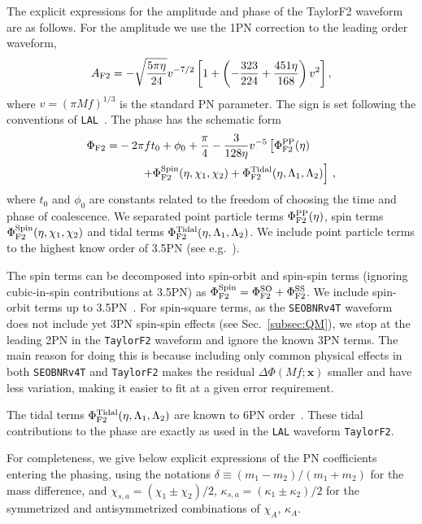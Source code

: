 \documentclass[prd,aps,letter,twocolumn,floatfix,notitlepage,nofootinbib]{revtex4-1}
\def\bx{\mathbf{x}}
\begin{document}
The explicit expressions for the amplitude and phase of the TaylorF2 waveform are as follows. For the amplitude we use the 1PN correction to the leading order waveform,
\begin{equation}
A_{\rm F2} = -\sqrt{\frac{5\pi\eta}{24}} v^{-7/2} \left[ 1 + \left(-\frac{323}{224} + \frac{451\eta}{168} \right)v^{2} \right],
\end{equation}
where $v=(\pi M f)^{1/3}$ is the standard PN parameter. The sign is set following the conventions of \texttt{LAL}~\cite{lal}. The phase has the schematic form
\begin{align}
\Phi_{\rm F2} =& -2\pi f t_{0} + \phi_{0} + \frac{\pi}{4} - \frac{3}{128\eta}v^{-5} \left[\Phi_{\rm F2}^{\rm PP}(\eta) \right. \nonumber\\
	& \left. \qquad + \Phi_{\rm F2}^{\rm Spin} (\eta, \chi_1, \chi_2) + \Phi_{\rm F2}^{\rm Tidal}(\eta, \Lambda_1, \Lambda_2)  \right] \,,
\end{align}
where $t_{0}$ and $\phi_{0}$ are constants related to the freedom of choosing the time and phase of coalescence. We separated point particle terms $\Phi_{\rm F2}^{\rm PP}(\eta)$, spin terms $\Phi_{\rm F2}^{\rm Spin}(\eta, \chi_{1}, \chi_{2})$ and tidal terms $\Phi_{\rm F2}^{\rm Tidal}(\eta, \Lambda_1, \Lambda_2)$. We include point particle terms to the highest know order of 3.5PN (see e.g.~\cite{Blanchet2014Review}).

The spin terms can be decomposed into spin-orbit and spin-spin terms (ignoring cubic-in-spin contributions at 3.5PN) as $\Phi_{\rm F2}^{\rm Spin} = \Phi_{\rm F2}^{\rm SO}  + \Phi_{\rm F2}^{\rm SS} $. We include spin-orbit terms up to 3.5PN~\cite{Blanchet2014Review}. For spin-square terms, as the \texttt{SEOBNRv4T} waveform does not include yet 3PN spin-spin effects (see Sec.~\ref{subsec:QM}), we stop at  the leading 2PN in the \texttt{TaylorF2} waveform and ignore the known 3PN terms. The main reason for doing this is because including only common physical effects in both \texttt{SEOBNRv4T} and \texttt{TaylorF2} makes the residual $\Delta\Phi(Mf; \bx)$ smaller and have less variation, making it easier to fit at a given error requirement.

The tidal terms $\Phi_{\rm F2}^{\rm Tidal}(\eta, \Lambda_1, \Lambda_2)$ are known to 6PN order~\cite{VinesFlanaganHinderer2011}. These tidal contributions to the phase are exactly as used in the \texttt{LAL} waveform \texttt{TaylorF2}.

For completeness, we give below explicit expressions of the PN coefficients entering the phasing, using the notations $\delta \equiv (m_{1} - m_{2})/(m_{1} + m_{2})$ for the mass difference, and $\chi_{s,a} = (\chi_{1} \pm \chi_{2})/2$, $\kappa_{s,a} = (\kappa_{1} \pm \kappa_{2})/2$ for the symmetrized and antisymmetrized combinations of $\chi_{A}$, $\kappa_{A}$.
\end{document}
